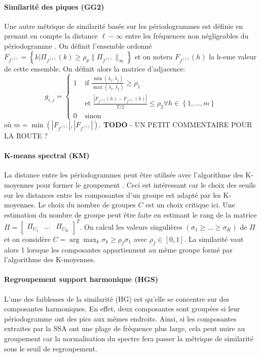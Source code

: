 \documentclass{gretsi}
\newcommand{\val}[3]{(#1_1 #3 \dots #3 #1_#2)}
\newcommand{\set}[1]{\left \{ 1, \dots, #1 \right \}}
\newcommand{\inter}{\left[0, 1\right]}
\begin{document}
\paragraph{Similarité des piques (GG2)}\label{par:GG2}
    Une autre métrique de similarité basée sur les périodogrammes est définie en prenant en compte la distance $\ell-\infty$ entre les fréquences non négligeables du périodogramme \cite{abalov_14_auto}. On définit l'ensemble ordonné $F_{f^{(i)}} = \left \{ k | \Pi_{f^{(i)}}(k) \ge \rho_p \|\Pi_{f^{(i)}}\|_\infty \right \}$ et on notera $F_{f^{(i)}}(h)$ la h-eme valeur de cette ensemble. On définit alors la matrice d'adjacence:
    $$
    g_{i, j} = \begin{cases}
	    1 & \text{ if } \displaystyle\frac{\min(\lambda_i, \lambda_j)}{\max(\lambda_i, \lambda_j)} \ge \rho_1\\
	      & \text{ et } \frac{|F_{f^{(i)}}(h) - F_{f^{(i)}}(h)|}{T/2} \le \rho_2 \forall h \in \set{m}\\
	    0 & \text{ sinon}
    \end{cases}
    $$ où $m = \min\left(\left|F_{f^{(i)}}\right|, \left|F_{f^{(i)}}\right|\right)$.
{\color{red} \textbf{TODO} - UN PETIT COMMENTAIRE POUR LA ROUTE ?
} 

\paragraph{K-means spectral (KM)}\label{par:KM}
    La distance entre les périodogrammes peut être utilisée avec l'algorithme des K-moyennes pour former le groupement \cite{alvarez_13_auto}. Ceci est intéressant car le choix des seuils sur les distances entre les composantes d'un groupe est adapté par les K-moyennes. Le choix du nombre de groupes $C$ est un choix critique ici. Une estimation du nombre de groupe peut être faite en estimant le rang de la matrice $\Pi = \begin{bmatrix}\Pi_{U_1}&\dots&\Pi_{U_K}\end{bmatrix}^T$. On calcul les valeurs singulières $\val{\sigma}{K}{\ge}$ de $\Pi$ et on considère $C = \arg\max_k \sigma_k \ge \rho_f \sigma_1$ avec $\rho_f \in \inter$. La similarité vaut alors 1 lorsque les composantes appartiennent au même groupe formé par l'algorithme des K-moyennes.


\paragraph{Regroupement support harmonique (HGS)}\label{par:HGS}
    L'une des faiblesses de la similarité (HG) est qu'elle se concentre sur des composantes harmoniques. En effet, deux composantes sont groupées si leur périodogramme ont des pics aux mêmes endroits. Ainsi, si les composantes extraites par la SSA ont une plage de fréquence plus large, cela peut nuire au groupement car la normalisation du spectre fera passer la métrique de similarité sous le seuil de regroupement.
    
\end{document}
